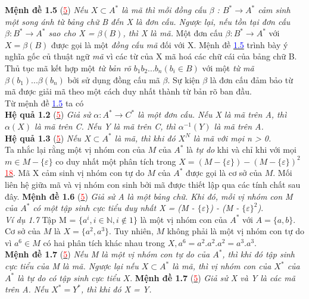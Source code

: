 \begin{flushleft}
\textbf{Mệnh đề 1.5} (\hyperlink{page.80}{\textcolor{red}{5}})  \textit{Nếu $X \subset A^*$ là mã thì mỗi đồng cấu $\beta$ : $B^* \to A^*$ cảm sinh một song ánh từ bảng chữ B đến X là đơn cấu. Ngược lại, nếu tồn tại đơn cấu $\beta : B^* \to A^*$ sao cho X = $\beta(B)$, thì X là mã.}
\hspace{10mm}Một đơn cấu $\beta : B^* \to A^*$ với $X = \beta(B)$ được gọi là một \textit{đồng cấu mã} đối với X. Mệnh đề \hyperlink{page.20}{\textcolor{blue}{1.5}} trình bày ý nghĩa gốc củ thuật ngữ \textit{mã} vì các từ của X mã hoá các chữ cái của bảng chữ B. Thủ tục mã kết hợp một \textit{từ bản rõ} $b_1b_2...b_n (b_i \in B)$ với một \textit{từ mã} $\beta(b_1)...\beta(b_n)$ bởi sử dụng đồng cấu mã $\beta$. Sự kiện $\beta$ là đơn cấu đảm bảo từ mã được giải mã theo một cách duy nhất thành từ bản rõ ban đầu.\\
\hspace{10mm} Từ mệnh đề \hyperlink{page.20}{\textcolor{blue}{1.5}} ta có \\
\textbf{Hệ quả 1.2} (\hyperlink{page.81}{\textcolor{red}{5}})  \textit{ Giả sử $\alpha : A^* \to C^*$ là một đơn cấu. Nếu X là mã trên A, thì $\alpha(X)$ là mã trên C. Nếu Y là mã trên C, thì $\alpha^{-1}(Y)$ là mã trên A.}\\
\textbf{Hệ quả 1.3} (\hyperlink{page.81}{\textcolor{red}{5}}) \textit{Nếu $X \subset A^*$ là mã, thì khi đó $X^N$ là mã với mọi n > 0.}\\
\hspace{10mm} Ta nhắc lại rằng một vị nhóm con của $M$ của $A^*$ là \textit{tự do} khi và chỉ khi với mọi $m \in M - \{ \varepsilon \}$ co duy nhất một phân tích trong $X = (M - \{ \varepsilon \}) - (M - \{ \varepsilon \})^{2}$\hyperlink{page.81}{\textcolor{red}{18}}. Mã X cảm sinh vị nhóm con tự do $M$ của $A^*$ được gọi là cơ sở của $M$. Mối liên hệ giữa mã và vị nhóm con sinh bởi mã được thiết lập qua các tính chất sau đây.
\textbf{Mệnh đề 1.6} (\hyperlink{page.80}{\textcolor{red}{5}}) \textit{Giả sử A là một bảng chữ. Khi đó, mỗi vị nhóm con M của $A^*$ có một tập sinh cực tiểu duy nhất X = (M - $\{ \varepsilon \}$) - (M - $\{ \varepsilon \}^{2}$)}.\\
\textit{Ví dụ 1.7}  Tập M = $\{ a^i, i \in \mathbb{N}, i \not\in 1 \}$ là một vị nhóm con của $A^*$ với $A = \{ a,b \}$. Cơ sở của $M$ là $X = \{ a^2, a^3 \}$. Tuy nhiên, $M$ không phải là một vị nhóm con tự do vì $a^6 \in M$ có hai phân tích khác nhau trong $X, a^6 = a^2.a^2.a^2 = a^3.a^3.$ \\
\textbf{Mệnh đề 1.7} (\hyperlink{page.81}{\textcolor{red}{5}}) \textit{Nếu M là một vị nhóm con tự do của $A^*$, thì khi đó tập sinh cực tiểu của M là mã. Ngược lại nếu $X \subset A^*$ là mã, thì vị nhóm con của $X^*$ của $A^*$ là tự do có tập sinh cực tiểu $X$}.
\textbf{Mệnh đề 1.7} (\hyperlink{page.81}{\textcolor{red}{5}})  \textit{Giả sử X và Y là các mã trên A. Nếu $X^* = Y^*$, thì khi đó X = Y.}
\end{flushleft}

